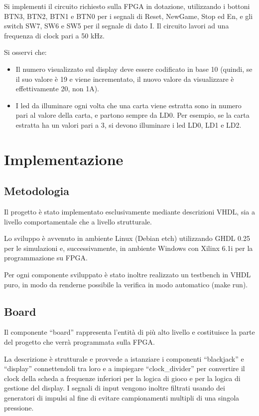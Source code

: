 \documentclass [11pt,a4paper,oneside]{article}
\begin{document}
Si implementi il circuito richiesto sulla FPGA in dotazione, utilizzando i bottoni BTN3,
BTN2, BTN1 e BTN0 per i segnali di Reset, NewGame, Stop ed En, e gli switch
SW7, SW6 e SW5 per il segnale di dato I. Il circuito lavori ad una frequenza di clock
pari a 50 kHz.

Si osservi che:
\begin{itemize}
\item Il numero visualizzato sul display deve essere codificato in base 10 (quindi, se
      il suo valore è 19 e viene incrementato, il nuovo valore da visualizzare è
      effettivamente 20, non 1A).

\item I led da illuminare ogni volta che una carta viene estratta sono in numero pari
      al valore della carta, e partono sempre da LD0. Per esempio, se la carta
      estratta ha un valori pari a 3, si devono illuminare i led LD0, LD1 e LD2.
\end{itemize}


\section{Implementazione}
\subsection{Metodologia}
Il progetto è stato implementato esclusivamente mediante descrizioni VHDL, sia a
livello comportamentale che a livello strutturale.

Lo sviluppo è avvenuto in ambiente Linux (Debian etch) utilizzando GHDL 0.25 per le
simulazioni e, successivamente, in ambiente Windows con Xilinx 6.1i per la
programmazione su FPGA.

Per ogni componente sviluppato è stato inoltre realizzato un testbench in VHDL 
puro, in modo da renderne possibile la verifica in modo automatico (make run). %

\subsection{Board}
Il componente ``board'' rappresenta l'entità di più alto livello e costituisce
la parte del progetto che verrà programmata sulla FPGA.



La descrizione è strutturale e provvede a istanziare i componenti ``blackjack''
e ``display'' connettendoli tra loro e a impiegare ``clock\_divider'' per 
convertire il clock della scheda a frequenze inferiori per la logica di 
gioco e per la logica di gestione del display. I segnali di input vengono 
inoltre filtrati usando dei generatori di impulsi al fine di evitare 
campionamenti multipli di una singola pressione.
\end{document}
